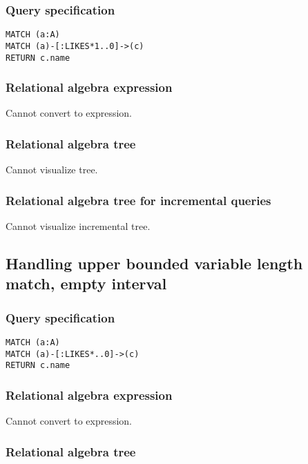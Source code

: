 \subsubsection*{Query specification}

\begin{lstlisting}
MATCH (a:A)
MATCH (a)-[:LIKES*1..0]->(c)
RETURN c.name
\end{lstlisting}

\subsubsection*{Relational algebra expression}

Cannot convert to expression.

\subsubsection*{Relational algebra tree}

Cannot visualize tree.

\subsubsection*{Relational algebra tree for incremental queries}

Cannot visualize incremental tree.

\subsection{Handling upper bounded variable length match, empty interval}

\subsubsection*{Query specification}

\begin{lstlisting}
MATCH (a:A)
MATCH (a)-[:LIKES*..0]->(c)
RETURN c.name
\end{lstlisting}

\subsubsection*{Relational algebra expression}

Cannot convert to expression.

\subsubsection*{Relational algebra tree}

